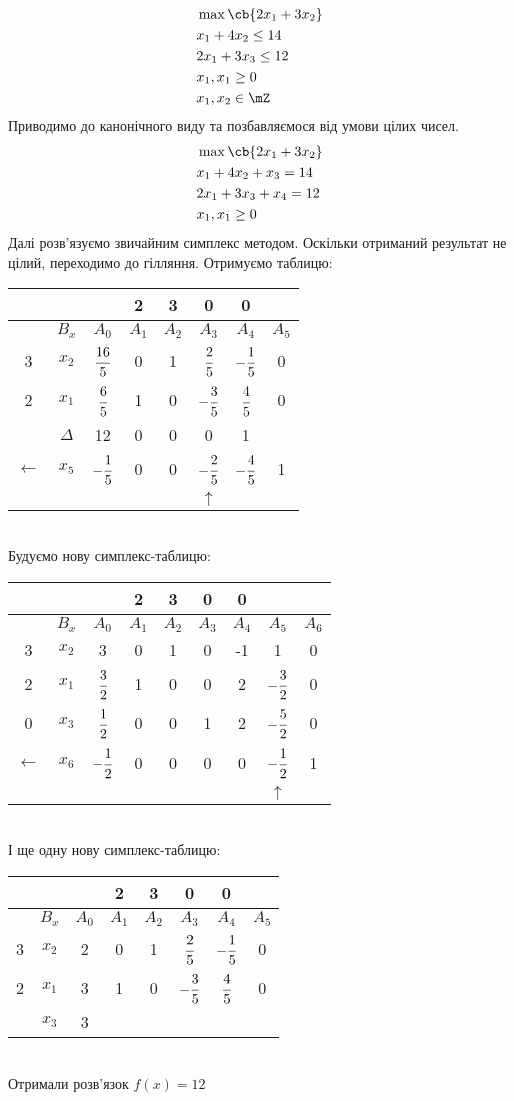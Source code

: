 \begin{exs}
\begin{eqnarray}
&\max\cb{2x_1+3x_2}\\
&x_1+4x_2\leq 14\\
&2x_1+3x_3\leq 12\\
&x_1,x_1\geq 0\\
&x_1,x_2\in\mZ
\end{eqnarray}
Приводимо до канонічного виду та позбавляємося від умови цілих чисел.
\begin{eqnarray}
&\max\cb{2x_1+3x_2}\\
&x_1+4x_2+x_3= 14\\
&2x_1+3x_3+x_4= 12\\
&x_1,x_1\geq 0
\end{eqnarray}
Далі розв’язуємо звичайним симплекс методом. Оскільки отриманий результат не цілий, переходимо до гілляння.
Отримуємо таблицю:\\
\begin{tabular}{c|c|c|c|c|c|c|c}
\hline
&&&2 & 3 & 0 & 0\\
\hline
& $B_x$ & $A_0$ & $A_1$ & $A_2$ & $A_3$ & $A_4$ & $A_5$ \\
\hline
3 & $x_2$ & $\cfrac{16}5$ & 0 & 1 & $\cfrac25$ & $-\cfrac15$ & 0\\
\hline
2 & $x_1$ & $\cfrac65$ & 1 & 0 & $-\cfrac35$ & $\cfrac45$ & 0\\
\hline
& $\Delta$ & 12 & 0 & 0 & 0 & 1\\
\hline
$\leftarrow$&  $x_5$ & $-\cfrac15$ & 0 & 0 & $-\cfrac25$ & $-\cfrac45$ &1 \\
\hline
&&&&&$\uparrow$&\\
\end{tabular}\\
Будуємо нову симплекс-таблицю:\\
\begin{tabular}{c|c|c|c|c|c|c|c|c}
&&&2 & 3 & 0 & 0\\
\hline
& $B_x$ & $A_0$ & $A_1$ & $A_2$ & $A_3$ & $A_4$ & $A_5$ & $A_6$\\
\hline
3 & $x_2$ & 3 & 0 & 1 & 0 & -1 & 1 & 0\\
\hline
2 & $x_1$ & $\cfrac32$ & 1 & 0 & 0 & 2 & $-\cfrac32$ & 0\\
\hline
0&  $x_3$ & $\cfrac12$ & 0 & 0 & 1 & 2 & $-\cfrac52$ & 0\\
\hline
$\leftarrow$& $x_6$ & $-\cfrac12$ & 0 & 0 & 0  & 0 & $-\cfrac12$ & 1\\
&&&&&&&$\uparrow$&
\end{tabular}\\
І ще одну нову симплекс-таблицю:\\
\begin{tabular}{c|c|c|c|c|c|c|c}
&&&2 & 3 & 0 & 0\\
\hline
& $B_x$ & $A_0$ & $A_1$ & $A_2$ & $A_3$ & $A_4$ & $A_5$ \\
\hline
3 & $x_2$ & 2 & 0 & 1 & $\cfrac25$ & $-\cfrac15$ & 0\\
\hline
2 & $x_1$ & 3 & 1 & 0 & $-\cfrac35$ & $\cfrac45$ & 0\\
\hline
& $x_3$ & 3 &&&&&
\end{tabular}\\
Отримали розв’язок $f(x) = 12$
\end{exs}